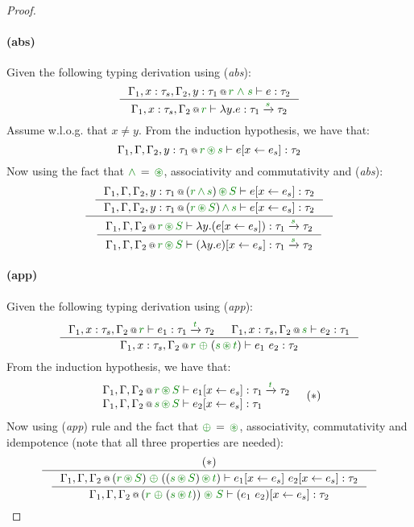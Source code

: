 \begin{proof}
\paragraph{(abs)} Given the following typing derivation using (\emph{abs}):
\[
\inference
  {\coctx{\Gamma_1,x:\tau_s,\Gamma_2, y:\tau_1}{\cclrd{r}\;\czip\;\cclrd{s}} \vdash e : \tau_2}
  {\coctx{\Gamma_1,x:\tau_s,\Gamma_2}{\cclrd{r}} \vdash \lambda y.e : \tau_1 \xrightarrow{\cclrd{s}} \tau_2 }
\]
Assume w.l.o.g. that $x\neq y$. From the induction hypothesis, we have that:
\[
\coctx{\Gamma_1,\Gamma,\Gamma_2, y:\tau_1}{ \cclrd{r} \,\cseq\, \cclrd{s} } \vdash \subst{e}{x}{e_s} : \tau_2
\]
Now using the fact that $\czip\,=\,\cseq$, associativity and commutativity and (\emph{abs}):
\[
\inference
 {\inference
  {\coctx{\Gamma_1,\Gamma,\Gamma_2, y:\tau_1}{ (\cclrd{r} \,\czip\, \cclrd{s})\,\cseq\,\cclrd{S} } \vdash \subst{e}{x}{e_s} : \tau_2}
  {\coctx{\Gamma_1,\Gamma,\Gamma_2, y:\tau_1}{ (\cclrd{r} \,\cseq\, \cclrd{S})\,\czip\,\cclrd{s} } \vdash \subst{e}{x}{e_s} : \tau_2}}
 {\inference
  {\coctx{\Gamma_1,\Gamma,\Gamma_2}{\cclrd{r} \,\cseq\, \cclrd{S}} \vdash \lambda y.(\subst{e}{x}{e_s}) : \tau_1 \xrightarrow{\cclrd{s}} \tau_2}
  {\coctx{\Gamma_1,\Gamma,\Gamma_2}{\cclrd{r} \,\cseq\, \cclrd{S}} \vdash \subst{(\lambda y.e)}{x}{e_s} : \tau_1 \xrightarrow{\cclrd{s}} \tau_2} }
\]

\paragraph{(app)} Given the following typing derivation using (\emph{app}):
\[
\inference
  {\coctx{\Gamma_1,x:\tau_s,\Gamma_2}{\cclrd{r}} \vdash e_1 : \tau_1 \xrightarrow{\cclrd{t}} \tau_2 &
   \coctx{\Gamma_1,x:\tau_s,\Gamma_2}{\cclrd{s}} \vdash e_2 : \tau_1 }
  {\coctx{\Gamma_1,x:\tau_s,\Gamma_2}{\cclrd{r} \;\cpar\; (\cclrd{s} \,\cseq\, \cclrd{t})} \vdash e_1~e_2 : \tau_2}
\]
From the induction hypothesis, we have that:
\[
\begin{array}{l}
 \coctx{\Gamma_1, \Gamma, \Gamma_2}{\cclrd{r}\,\cseq\,\cclrd{S}} \vdash \subst{e_1}{x}{e_s} : \tau_1 \xrightarrow{\cclrd{t}} \tau_2 \\
 \coctx{\Gamma_1, \Gamma, \Gamma_2}{\cclrd{s}\,\cseq\,\cclrd{S}} \vdash \subst{e_2}{x}{e_s} : \tau_1
\end{array}\quad(*)
\]
Now using (\emph{app}) rule and the fact that $\cpar\,=\,\cseq$, associativity, commutativity and idempotence
(note that all three properties are needed):
\[
\inference
 { (*) }
 {\inference
   { \coctx{\Gamma_1,\Gamma,\Gamma_2}{(\cclrd{r}\,\cseq\,\cclrd{S}) \;\cpar\; ((\cclrd{s}\,\cseq\,\cclrd{S}) \,\cseq\, \cclrd{t})} 
       \vdash \subst{e_1}{x}{e_s}~\subst{e_2}{x}{e_s} : \tau_2}
   { \coctx{\Gamma_1,\Gamma,\Gamma_2}{(\cclrd{r} \;\cpar\; (\cclrd{s} \,\cseq\, \cclrd{t}))\;\cseq\;\cclrd{S}} 
       \vdash \subst{(e_1~e_2)}{x}{e_s} : \tau_2} }
\]


\end{proof}
